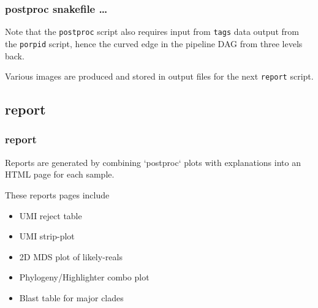 \documentclass{beamer}
\begin{document}
\begin{frame}[fragile]
\frametitle{postproc snakefile \ldots }

\alert<1> 

\bigskip
Note that the {\tt postproc} script also requires input from {\tt tags} data output from the 
{\tt porpid} script, hence the curved edge in the pipeline DAG from three 
levels back.

\bigskip
Various images are produced and stored in output files for the next {\tt report} script.

\end{frame}


\subsection{report}

\begin{frame}[fragile]
\frametitle{report }

\alert<1> 

Reports are generated by combining `postproc` plots with explanations into an HTML page for each sample.

\bigskip
These reports pages include

\begin{itemize}
	\item UMI reject table
	\item UMI strip-plot
	\item 2D MDS plot of likely-reals
	\item Phylogeny/Highlighter combo plot
	\item Blast table for major clades
\end{itemize}

\end{frame}
\end{document}
